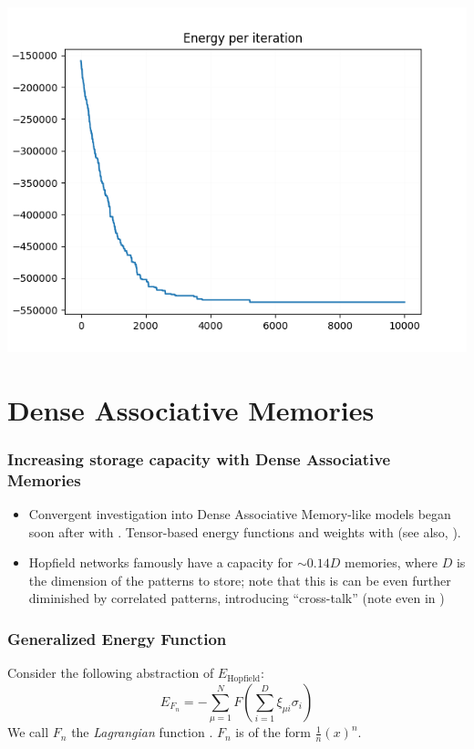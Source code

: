 \documentclass{beamer}
\begin{document}
\begin{frame}
\centering
\includegraphics[width=\textwidth, height=\textheight]{hopfield_recall_energy.png}
\end{frame}

\section{Dense Associative Memories}

\begin{frame}
\frametitle{Increasing storage capacity with Dense Associative Memories}
\begin{itemize}
\item Convergent investigation into Dense Associative Memory-like models began
soon after \textcite{hopfield_neural_1982} with 
\textcites{hintzman_minerva_1984}. Tensor-based energy functions and weights
with \textcites{chen_high_1986,psaltis_nonlinear_1986} (see also, \textcite{kelly_memory_2017}).

\item Hopfield networks famously have a capacity for $\sim 0.14D$ memories, where
$D$ is the dimension of the patterns to store; note that this is can be even
further diminished by correlated patterns, introducing ``cross-talk'' 
(note even in \textcite{anderson_correlation_1988})

\end{itemize}
\end{frame}

\begin{frame}
\frametitle{Generalized Energy Function}

\begin{definition}
    Consider the following abstraction of $E_\text{Hopfield}$:
    $$
    E_{F_n} = - \sum^N_{\mu=1} F \left(\sum^D_{i=1} \xi_{\mu i} \sigma_i \right)
    $$
    We call $F_n$ the \textit{Lagrangian} function \parencite{krotov_hierarchical_2021}.
    $F_n$ is of the form $\frac{1}{n} (x)^n$.
\end{definition}
\end{frame}
\end{document}
